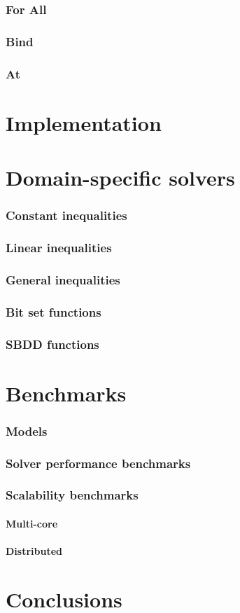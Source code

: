 	\subsection{For All}
	\subsection{Bind}
	\subsection{At}

\chapter{Implementation}

\chapter{Domain-specific solvers}
	\subsection{Constant inequalities}
	\subsection{Linear inequalities}
	\subsection{General inequalities}
	\subsection{Bit set functions}
	\subsection{SBDD functions}

\chapter{Benchmarks}
	\subsection{Models}
	\subsection{Solver performance benchmarks}
	\subsection{Scalability benchmarks}
		\subsubsection{Multi-core}
		\subsubsection{Distributed}

\chapter{Conclusions}

  \printbibliography[heading=bibintoc] %




